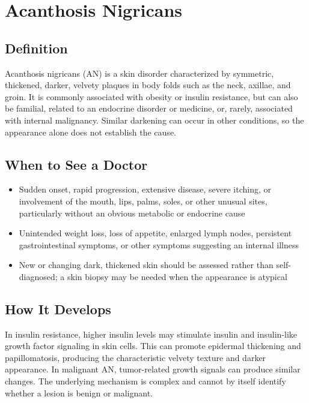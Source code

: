 \chapter{Acanthosis Nigricans}

\section*{Definition}
Acanthosis nigricans (AN) is a skin disorder characterized by symmetric, thickened, darker, velvety plaques in body folds such as the neck, axillae, and groin. It is commonly associated with obesity or insulin resistance, but can also be familial, related to an endocrine disorder or medicine, or, rarely, associated with internal malignancy. Similar darkening can occur in other conditions, so the appearance alone does not establish the cause.

\section*{When to See a Doctor}

\begin{itemize}
 \item Sudden onset, rapid progression, extensive disease, severe itching, or involvement of the mouth, lips, palms, soles, or other unusual sites, particularly without an obvious metabolic or endocrine cause
 \item Unintended weight loss, loss of appetite, enlarged lymph nodes, persistent gastrointestinal symptoms, or other symptoms suggesting an internal illness
 \item New or changing dark, thickened skin should be assessed rather than self-diagnosed; a skin biopsy may be needed when the appearance is atypical
\end{itemize}

\section*{How It Develops}
In insulin resistance, higher insulin levels may stimulate insulin and insulin-like growth factor signaling in skin cells. This can promote epidermal thickening and papillomatosis, producing the characteristic velvety texture and darker appearance. In malignant AN, tumor-related growth signals can produce similar changes. The underlying mechanism is complex and cannot by itself identify whether a lesion is benign or malignant.

